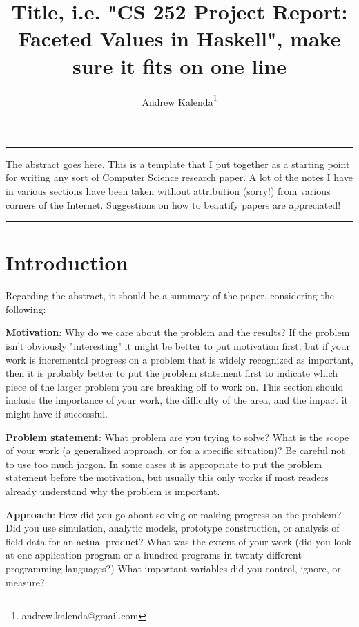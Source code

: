 \documentclass[12pt,a4paper]{article}
\renewenvironment{abstract}{%
	\hfill\begin{minipage}{0.95\textwidth}
		\rule{\textwidth}{1pt}}
	{\par\noindent\rule{\textwidth}{1pt}\end{minipage}}
\begin{document}
	\title{Title, i.e. "CS 252 Project Report: Faceted Values in Haskell", make sure it fits on one line}
	\author[1]{Andrew Kalenda\thanks{andrew.kalenda@gmail.com}}
	\maketitle
	\begin{abstract}
	The abstract goes here. This is a template that I put together as a starting point for writing any sort of Computer Science research paper. A lot of the notes I have in various sections have been taken without attribution (sorry!) from various corners of the Internet. Suggestions on how to beautify papers are appreciated!
	
	\end{abstract}
	
	\section{Introduction}
	
	Regarding the abstract, it should be a summary of the paper, considering the following:
	 
	 \textbf{Motivation}:
	 Why do we care about the problem and the results? If the problem isn't obviously "interesting" it might be better to put motivation first; but if your work is incremental progress on a problem that is widely recognized as important, then it is probably better to put the problem statement first to indicate which piece of the larger problem you are breaking off to work on. This section should include the importance of your work, the difficulty of the area, and the impact it might have if successful.
	 
	 \textbf{Problem statement}:
	 What problem are you trying to solve? What is the scope of your work (a generalized approach, or for a specific situation)? Be careful not to use too much jargon. In some cases it is appropriate to put the problem statement before the motivation, but usually this only works if most readers already understand why the problem is important.
	 
	 \textbf{Approach}:
	 How did you go about solving or making progress on the problem? Did you use simulation, analytic models, prototype construction, or analysis of field data for an actual product? What was the extent of your work (did you look at one application program or a hundred programs in twenty different programming languages?) What important variables did you control, ignore, or measure?
	 
\end{document}
